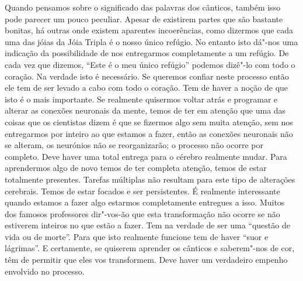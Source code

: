 Quando pensamos sobre o significado das palavras dos cânticos, também
isso pode parecer um pouco peculiar. Apesar de existirem partes que são
bastante bonitas, há outras onde existem aparentes incoerências, como
dizermos que cada uma das jóias da Jóia Tripla é o nosso único refúgio.
No entanto isto dá"-nos uma indicação da possibilidade de nos entregarmos
completamente a um refúgio. De cada vez que dizemos, ``Este é o meu
único refúgio'' podemos dizê"-lo com todo o coração. Na verdade isto é
necessário. Se queremos confiar neste processo então ele tem de ser
levado a cabo com todo o coração. Tem de haver a noção de que isto é o
mais importante. Se realmente quisermos voltar atrás e programar e
alterar as conexões neuronais da mente, temos de ter em atenção que uma
das coisas que os cientistas dizem é que se fizermos algo sem muita
atenção, sem nos entregarmos por inteiro ao que estamos a fazer, então
as conexões neuronais não se alteram, os neurónios não se reorganizarão;
o processo não ocorre por completo. Deve haver uma total entrega para o
cérebro realmente mudar. Para aprendermos algo de novo temos de ter
completa atenção, temos de estar totalmente presentes. Tarefas múltiplas
não resultam para este tipo de alterações cerebrais. Temos de estar
focados e ser persistentes. É realmente interessante quando estamos a
fazer algo estarmos completamente entregues a isso. Muitos dos famosos
professores dir"-vos-ão que esta transformação não ocorre se não
estiverem inteiros no que estão a fazer. Tem na verdade de ser uma
``questão de vida ou de morte''. Para que isto realmente funcione tem de
haver ``suor e lágrimas''. E certamente, se quiserem aprender os
cânticos e saberem"-nos de cor, têm de permitir que eles vos transformem.
Deve haver um verdadeiro empenho envolvido no processo.

